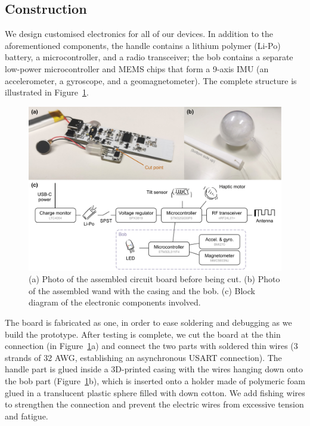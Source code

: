 \documentclass{nime-alternate} %
\begin{document}
\subsection{Construction}
We design customised electronics for all of our devices. In addition to the aforementioned components, the handle contains a lithium polymer (Li-Po) battery, a microcontroller, and a radio transceiver; the bob contains a separate low-power microcontroller and MEMS chips that form a 9-axis IMU (an accelerometer, a gyroscope, and a geomagnetometer). The complete structure is illustrated in Figure~\ref{fig:WandConstruction}.

\begin{figure}[t!]
  \centering
  \includegraphics[width=1\textwidth]{Mw_Wand.pdf}
  \caption{(a) Photo of the assembled circuit board before being cut. (b) Photo of the assembled wand with the casing and the bob. (c) Block diagram of the electronic components involved.}
  \label{fig:WandConstruction}
\end{figure}

The board is fabricated as one, in order to ease soldering and debugging as we build the prototype. After testing is complete, we cut the board at the thin connection (in Figure~\ref{fig:WandConstruction}a) and connect the two parts with soldered thin wires (3 strands of 32 AWG, establishing an asynchronous USART connection). The handle part is glued inside a 3D-printed casing with the wires hanging down onto the bob part (Figure~\ref{fig:WandConstruction}b), which is inserted onto a holder made of polymeric foam glued in a translucent plastic sphere filled with down cotton. We add fishing wires to strengthen the connection and prevent the electric wires from excessive tension and fatigue.
\end{document}

